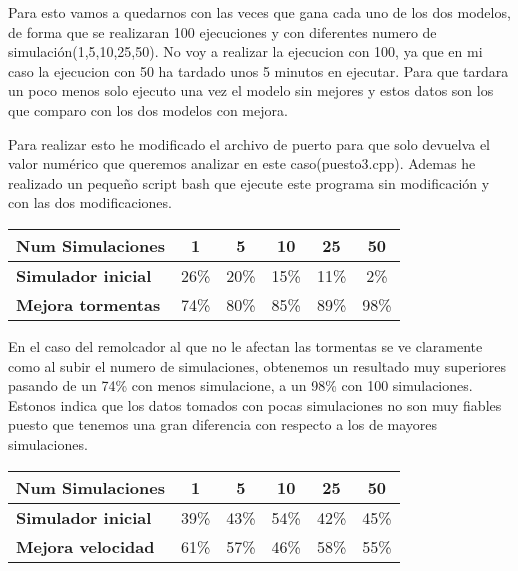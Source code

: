 \documentclass[]{article}
\begin{document}
Para esto vamos a quedarnos con las veces que gana cada uno de los dos modelos, de forma que se realizaran 100 ejecuciones y con diferentes numero de simulación(1,5,10,25,50).
No voy a realizar la ejecucion con 100, ya que en mi caso la ejecucion con 50 ha tardado unos 5 minutos en ejecutar. Para que tardara un poco menos solo ejecuto una vez el modelo sin mejores y estos datos son los que comparo con los dos modelos con mejora. 

Para realizar esto he modificado el archivo de puerto para que solo devuelva el valor numérico que queremos analizar en este caso(puesto3.cpp). Ademas he realizado un pequeño script bash que ejecute este programa sin modificación y con las dos modificaciones. 
\begin{table}[H]
	\begin{center}
		\begin{tabularx}{0.75\textwidth}{|X|c|c|c|c|c|}
			\hline
			\textbf{Num Simulaciones} &  \textbf{1} & \textbf{5} &\textbf{10} & \textbf{25} & \textbf{50}\\
			\hline \hline
			\textbf{Simulador inicial}&26\%  & 20\% & 15\% & 11\% & 2\% \\ \hline
			\textbf{Mejora tormentas}& 74\%& 80\%& 85\% & 89\% &  98\%\\ \hline
			
		\end{tabularx}
		
	\end{center}
\end{table}
En el caso del remolcador al que no le afectan las tormentas se ve claramente como al subir el numero de simulaciones, obtenemos un resultado muy superiores pasando de un 74\% con menos simulacione, a un 98\% con 100 simulaciones. Estonos indica que los datos tomados con pocas simulaciones no son muy fiables puesto que tenemos una gran diferencia con respecto a los de mayores simulaciones.

\begin{table}[H]
	\begin{center}
		\begin{tabularx}{0.75\textwidth}{|X|c|c|c|c|c|}
			\hline
			\textbf{Num Simulaciones} &  \textbf{1} & \textbf{5} &\textbf{10} & \textbf{25} & \textbf{50}\\
			\hline \hline
			\textbf{Simulador inicial}& 39\% & 43\% & 54\% &42\%& 45\% \\ \hline
			\textbf{Mejora velocidad}&61\% & 57\% & 46\% & 58\% & 55\% \\ \hline
			
		\end{tabularx}
		
	\end{center}
\end{table}
\end{document}

